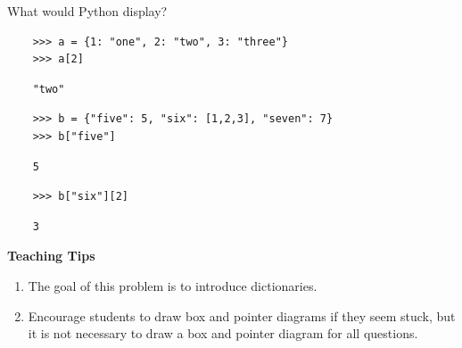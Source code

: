 \begin{blocksection}
    \question What would Python display?
    
    \begin{lstlisting}
    >>> a = {1: "one", 2: "two", 3: "three"}
    >>> a[2]
    \end{lstlisting}
    \begin{solution}[.25in]
    \begin{lstlisting}
    "two"
    \end{lstlisting}
    \end{solution}

    \begin{lstlisting}
    >>> b = {"five": 5, "six": [1,2,3], "seven": 7}
    >>> b["five"]
    \end{lstlisting}
    \begin{solution}[.25in]
    \begin{lstlisting}
    5
    \end{lstlisting}
    \end{solution}

    \begin{lstlisting}
    >>> b["six"][2]
    \end{lstlisting}
    \begin{solution}[.25in]
    \begin{lstlisting}
    3
    \end{lstlisting}
    \end{solution}
    
    \begin{questionmeta}
        \textbf{Teaching Tips}
        \begin{enumerate}
                \item The goal of this problem is to introduce dictionaries. 
                \item Encourage students to draw box and pointer diagrams if they seem stuck, but it is not necessary to draw a box and pointer diagram for all questions.
        \end{enumerate} 
    \end{questionmeta}
\end{blocksection}
